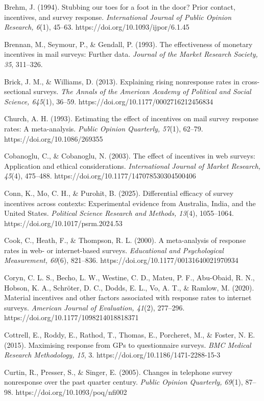 Brehm, J. (1994). Stubbing our toes for a foot in the door? Prior contact, incentives, and survey response. \textit{International Journal of Public Opinion Research, 6}(1), 45–63. https://doi.org/10.1093/ijpor/6.1.45

Brennan, M., Seymour, P., \& Gendall, P. (1993). The effectiveness of monetary incentives in mail surveys: Further data. \textit{Journal of the Market Research Society, 35}, 311–326.

Brick, J. M., \& Williams, D. (2013). Explaining rising nonresponse rates in cross-sectional surveys. \textit{The Annals of the American Academy of Political and Social Science, 645}(1), 36–59. https://doi.org/10.1177/0002716212456834

Church, A. H. (1993). Estimating the effect of incentives on mail survey response rates: A meta-analysis. \textit{Public Opinion Quarterly, 57}(1), 62–79. https://doi.org/10.1086/269355

Cobanoglu, C., \& Cobanoglu, N. (2003). The effect of incentives in web surveys: Application and ethical considerations. \textit{International Journal of Market Research, 45}(4), 475–488. https://doi.org/10.1177/147078530304500406

Conn, K., Mo, C. H., \& Purohit, B. (2025). Differential efficacy of survey incentives across contexts: Experimental evidence from Australia, India, and the United States. \textit{Political Science Research and Methods, 13}(4), 1055–1064. https://doi.org/10.1017/psrm.2024.53

Cook, C., Heath, F., \& Thompson, R. L. (2000). A meta-analysis of response rates in web- or internet-based surveys. \textit{Educational and Psychological Measurement, 60}(6), 821–836. https://doi.org/10.1177/00131640021970934

Coryn, C. L. S., Becho, L. W., Westine, C. D., Mateu, P. F., Abu-Obaid, R. N., Hobson, K. A., Schröter, D. C., Dodds, E. L., Vo, A. T., \& Ramlow, M. (2020). Material incentives and other factors associated with response rates to internet surveys. \textit{American Journal of Evaluation, 41}(2), 277–296. https://doi.org/10.1177/1098214018818371

Cottrell, E., Roddy, E., Rathod, T., Thomas, E., Porcheret, M., \& Foster, N. E. (2015). Maximising response from GPs to questionnaire surveys. \textit{BMC Medical Research Methodology, 15}, 3. https://doi.org/10.1186/1471-2288-15-3

Curtin, R., Presser, S., \& Singer, E. (2005). Changes in telephone survey nonresponse over the past quarter century. \textit{Public Opinion Quarterly, 69}(1), 87–98. https://doi.org/10.1093/poq/nfi002

